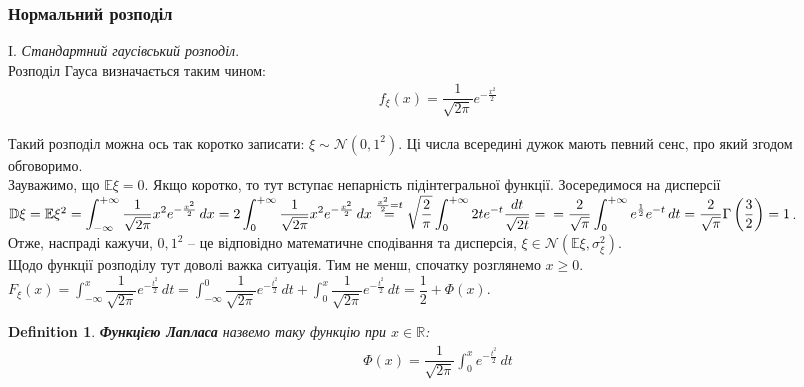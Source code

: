 \documentclass[a4paper, 10pt]{article}
\theoremstyle{theoremdd}
\newtheorem{definition}[theorem]{Definition}
\begin{document}
\subsubsection{Нормальний розподіл}
I. \textit{Стандартний гаусівський розподіл}.\\
Розподіл Гауса визначається таким чином:
\begin{align*}
f_\xi(x) = \dfrac{1}{\sqrt{2\pi}} e^{-\frac{x^2}{2}}
\end{align*}
\begin{figure}[H]
\centering
{}
\end{figure}
\noindent Такий розподіл можна ось так коротко записати: $\xi \sim \mathcal{N}(0,1^2)$. Ці числа всередині дужок мають певний сенс, про який згодом обговоримо.\\
Зауважимо, що $\mathbb{E}\xi = 0$. Якщо коротко, то тут вступає непарність підінтегральної функції. Зосередимося на дисперсії\\
$\mathbb{D}\xi = \mathbb{E}\xi^2 = \displaystyle\int_{-\infty}^{+\infty} \dfrac{1}{\sqrt{2\pi}} x^2 e^{-\frac{x^2}{2}}\,dx = 2\displaystyle\int_{0}^{+\infty} \dfrac{1}{\sqrt{2\pi}} x^2 e^{-\frac{x^2}{2}}\,dx \overset{\frac{x^2}{2} = t}{=} \sqrt{\dfrac{2}{\pi}} \int_0^{+\infty} 2t e^{-t} \dfrac{dt}{\sqrt{2t}} = \\
= \dfrac{2}{\sqrt{\pi}} \int_0^{+\infty} e^{\frac{1}{2}} e^{-t}\,dt = \dfrac{2}{\sqrt{\pi}} \Gamma\left(\dfrac{3}{2}\right) = 1$.\\
Отже, наспраді кажучи, $0,1^2$ -- це відповідно математичне сподівання та дисперсія, $\xi \in \mathcal{N}(\mathbb{E}\xi, \sigma^2_\xi)$.\\
Щодо функції розподілу тут доволі важка ситуація. Тим не менш, спочатку розглянемо $x \geq 0$.\\
$F_\xi(x) = \displaystyle\int_{-\infty}^x \dfrac{1}{\sqrt{2\pi}} e^{-\frac{t^2}{2}}\,dt = \int_{-\infty}^0 \dfrac{1}{\sqrt{2\pi}} e^{-\frac{t^2}{2}}\,dt + \int_{0}^x \dfrac{1}{\sqrt{2\pi}} e^{-\frac{t^2}{2}}\,dt = \dfrac{1}{2} + \Phi(x)$.

\begin{definition}
\textbf{Функцією Лапласа} назвемо таку функцію при $x \in \mathbb{R}$:
\begin{align*}
\Phi(x) = \dfrac{1}{\sqrt{2\pi}} \int_0^x e^{-\frac{t^2}{2}}\,dt
\end{align*} 
\end{definition}
\end{document}
